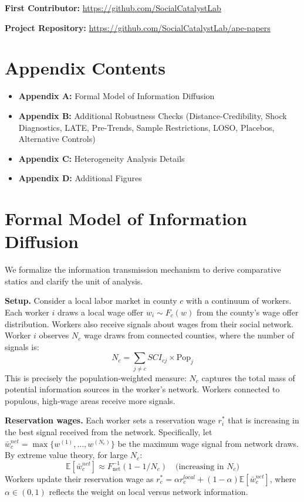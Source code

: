 \documentclass[12pt]{article}
\newcommand{\E}{\mathbb{E}}
\begin{document}
\noindent\textbf{First Contributor:} \url{https://github.com/SocialCatalystLab}

\noindent\textbf{Project Repository:} \url{https://github.com/SocialCatalystLab/ape-papers}


\clearpage
\appendix

\section*{Appendix Contents}
\begin{itemize}
\item \textbf{Appendix A:} Formal Model of Information Diffusion
\item \textbf{Appendix B:} Additional Robustness Checks (Distance-Credibility, Shock Diagnostics, LATE, Pre-Trends, Sample Restrictions, LOSO, Placebos, Alternative Controls)
\item \textbf{Appendix C:} Heterogeneity Analysis Details
\item \textbf{Appendix D:} Additional Figures
\end{itemize}

\section{Formal Model of Information Diffusion}
\label{sec:formal_model_appendix}

We formalize the information transmission mechanism to derive comparative statics and clarify the unit of analysis.

\textbf{Setup.} Consider a local labor market in county $c$ with a continuum of workers. Each worker $i$ draws a local wage offer $w_i \sim F_c(w)$ from the county's wage offer distribution. Workers also receive signals about wages from their social network. Worker $i$ observes $N_c$ wage draws from connected counties, where the number of signals is:
\begin{equation}
N_c = \sum_{j \neq c} SCI_{cj} \times \text{Pop}_j
\end{equation}
This is precisely the population-weighted measure: $N_c$ captures the total mass of potential information sources in the worker's network. Workers connected to populous, high-wage areas receive more signals.

\textbf{Reservation wages.} Each worker sets a reservation wage $r^*_i$ that is increasing in the best signal received from the network. Specifically, let $\bar{w}^{net}_c = \max\{w^{(1)}, \ldots, w^{(N_c)}\}$ be the maximum wage signal from network draws. By extreme value theory, for large $N_c$:
\begin{equation}
\E[\bar{w}^{net}_c] \approx F^{-1}_{\text{net}}(1 - 1/N_c) \quad \text{(increasing in } N_c\text{)}
\end{equation}
Workers update their reservation wage as $r^*_c = \alpha r^{local}_c + (1-\alpha) \E[\bar{w}^{net}_c]$, where $\alpha \in (0,1)$ reflects the weight on local versus network information.
\end{document}
